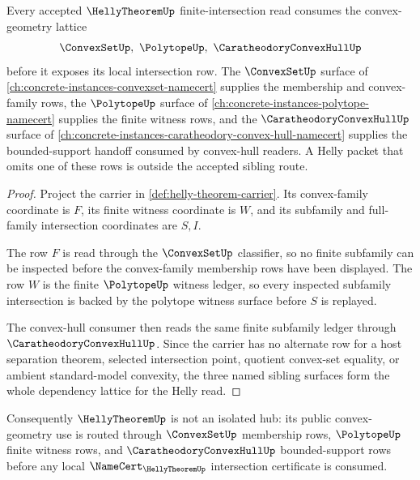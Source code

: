 \begin{theorem}
\label{thm:helly-theorem-convex-geometry-dependency-lattice}
Every accepted $\HellyTheoremUp$ finite-intersection read consumes the convex-geometry lattice
$$
\ConvexSetUp,\ \PolytopeUp,\ \CaratheodoryConvexHullUp
$$
before it exposes its local intersection row. The $\ConvexSetUp$ surface of \autoref{ch:concrete-instances-convexset-namecert} supplies the membership and convex-family rows, the $\PolytopeUp$ surface of \autoref{ch:concrete-instances-polytope-namecert} supplies the finite witness rows, and the $\CaratheodoryConvexHullUp$ surface of \autoref{ch:concrete-instances-caratheodory-convex-hull-namecert} supplies the bounded-support handoff consumed by convex-hull readers. A Helly packet that omits one of these rows is outside the accepted sibling route.
\end{theorem}
\begin{proof}
Project the carrier in \autoref{def:helly-theorem-carrier}. Its convex-family coordinate is $F$, its finite witness coordinate is $W$, and its subfamily and full-family intersection coordinates are $S,I$.

The row $F$ is read through the $\ConvexSetUp$ classifier, so no finite subfamily can be inspected before the convex-family membership rows have been displayed. The row $W$ is the finite $\PolytopeUp$ witness ledger, so every inspected subfamily intersection is backed by the polytope witness surface before $S$ is replayed.

The convex-hull consumer then reads the same finite subfamily ledger through $\CaratheodoryConvexHullUp$. Since the carrier has no alternate row for a host separation theorem, selected intersection point, quotient convex-set equality, or ambient standard-model convexity, the three named sibling surfaces form the whole dependency lattice for the Helly read.
\end{proof}

Consequently $\HellyTheoremUp$ is not an isolated hub: its public convex-geometry use is routed through $\ConvexSetUp$ membership rows, $\PolytopeUp$ finite witness rows, and $\CaratheodoryConvexHullUp$ bounded-support rows before any local $\NameCert_{\HellyTheoremUp}$ intersection certificate is consumed.
